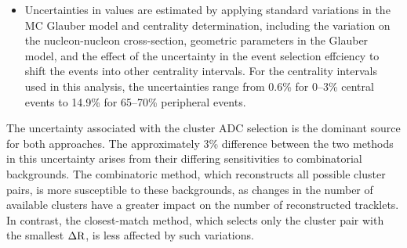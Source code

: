 \begin{itemize}
    \item Uncertainties in \npart values are estimated by applying standard variations in the MC Glauber model and centrality determination, including the variation on the nucleon-nucleon cross-section, geometric parameters in the Glauber model, and the effect of the uncertainty in the event selection effciency to shift the events into other centrality intervals. For the centrality intervals used in this analysis, the uncertainties range from 0.6\% for 0–3\% central events to 14.9\% for 65–70\% peripheral events.
\end{itemize}

The uncertainty associated with the cluster ADC selection is the dominant source for both approaches. The approximately 3\% difference between the two methods in this uncertainty arises from their differing sensitivities to combinatorial backgrounds. The combinatoric method, which reconstructs all possible cluster pairs, is more susceptible to these backgrounds, as changes in the number of available clusters have a greater impact on the number of reconstructed tracklets. In contrast, the closest-match method, which selects only the cluster pair with the smallest $\Delta \text{R}$, is less affected by such variations. 

